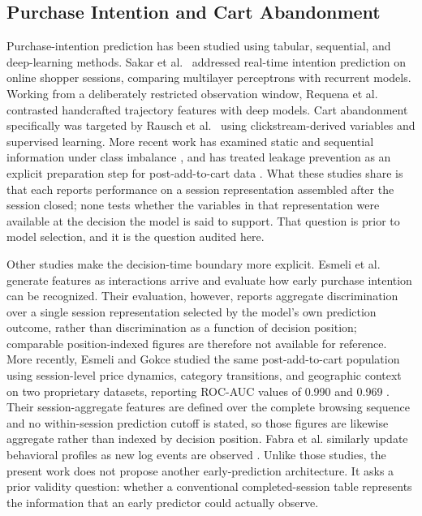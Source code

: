 \documentclass[conference, letterpaper]{IEEEtran}
\begin{document}
\subsection{Purchase Intention and Cart Abandonment}
Purchase-intention prediction has been studied using tabular, sequential, and deep-learning methods. Sakar et al.~\cite{sakar2019} addressed real-time intention prediction on online shopper sessions, comparing multilayer perceptrons with recurrent models. Working from a deliberately restricted observation window, Requena et al.~\cite{requena2020} contrasted handcrafted trajectory features with deep models. Cart abandonment specifically was targeted by Rausch et al.~\cite{rausch2022} using clickstream-derived variables and supervised learning. More recent work has examined static and sequential information under class imbalance \cite{waldmann2025}, and has treated leakage prevention as an explicit preparation step for post-add-to-cart data \cite{suleiman2026}. What these studies share is that each reports performance on a session representation assembled after the session closed; none tests whether the variables in that representation were available at the decision the model is said to support. That question is prior to model selection, and it is the question audited here.

Other studies make the decision-time boundary more explicit. Esmeli et al.~\cite{esmeli2021} generate features as interactions arrive and evaluate how early purchase intention can be recognized. Their evaluation, however, reports aggregate discrimination over a single session representation selected by the model's own prediction outcome, rather than discrimination as a function of decision position; comparable position-indexed figures are therefore not available for reference. More recently, Esmeli and Gokce studied the same post-add-to-cart population using session-level price dynamics, category transitions, and geographic context on two proprietary datasets, reporting ROC-AUC values of 0.990 and 0.969 \cite{esmeli2025}. Their session-aggregate features are defined over the complete browsing sequence and no within-session prediction cutoff is stated, so those figures are likewise aggregate rather than indexed by decision position. Fabra et al. similarly update behavioral profiles as new log events are observed \cite{fabra2020}. Unlike those studies, the present work does not propose another early-prediction architecture. It asks a prior validity question: whether a conventional completed-session table represents the information that an early predictor could actually observe.
\end{document}
